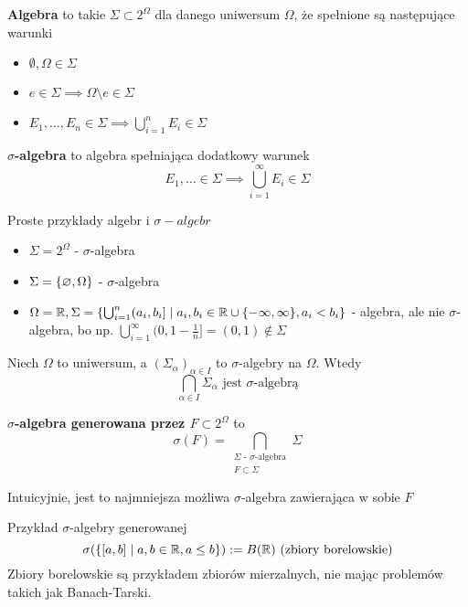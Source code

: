 \begin{definition}
	\textbf{Algebra} to takie \(\Sigma \subset 2^{\Omega}\) dla danego uniwersum \(\Omega\), że spełnione są następujące warunki
	\begin{itemize}
		\item \(\emptyset, \Omega \in \Sigma\)
		\item \(e \in \Sigma \implies \Omega \setminus e \in \Sigma\)
		\item \(E_1, \dots, E_n \in \Sigma \implies \bigcup_{i=1}^n E_i \in \Sigma\)
	\end{itemize}
\end{definition}

\begin{definition}
	\textbf{\(\sigma\)-algebra} to algebra spełniająca dodatkowy warunek
	\[
		E_1, \dots \in \Sigma \implies \bigcup_{i=1}^{\infty} E_i \in \Sigma
	\]
\end{definition}

\begin{example}
	Proste przykłady algebr i \(\sigma-algebr\)
	\begin{itemize}
		\item \(\Sigma = 2^{\Omega}\) - \(\sigma\)-algebra
		\item \(\Sigma = \set{\emptyset, \Omega}\) - \(\sigma\)-algebra
		\item \(\Omega = \real, \Sigma = \set{\bigcup_{i=1}^n (a_i, b_i] \mid a_i, b_i \in \real \cup \set{-\infty, \infty}, a_i < b_i}\) - algebra, ale nie \(\sigma\)-algebra, bo np. \(\bigcup_{i=1}^\infty (0, 1 - \frac{1}{n}] = (0, 1) \notin \Sigma\)
	\end{itemize}
\end{example}

\begin{lemma}
	Niech \(\Omega\) to uniwersum, a \((\Sigma_\alpha)_{\alpha \in I}\) to \(\sigma\)-algebry na \(\Omega\). Wtedy
	\[
		\bigcap_{\alpha \in I} \Sigma_\alpha \text{ jest \(\sigma\)-algebrą}
	\]
\end{lemma}

\begin{definition}
	\textbf{\(\sigma\)-algebra generowana przez \(F \subset 2^\Omega\)} to
	\[
		\sigma(F) = \bigcap_{\substack{\Sigma \text{ - } \sigma\text{-algebra}\\F \subset \Sigma}} \Sigma
	\]
	
	Intuicyjnie, jest to najmniejsza możliwa \(\sigma\)-algebra zawierająca w sobie \(F\)
\end{definition}

\begin{example}
	Przykład \(\sigma\)-algebry generowanej
	\[
		\sigma(\set{[a, b] \mid a, b \in \real, a \leq b}) := B(\real) \text{ (zbiory borelowskie)}
	\]
	Zbiory borelowskie są przykładem zbiorów mierzalnych, nie mając problemów takich jak Banach-Tarski.
\end{example}
